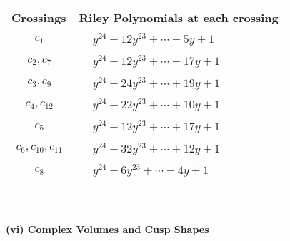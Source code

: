 \documentclass[1p]{elsarticle_modified}
\theoremstyle{definition}
\begin{document}
\begin{tabular}{m{50pt}|m{274pt}}
Crossings & \hspace{64pt}Riley Polynomials at each crossing \\
\hline $$\begin{aligned}c_{1}\end{aligned}$$&$\begin{aligned}
&y^{24}+12 y^{23}+\cdots-5 y+1
\end{aligned}$\\
\hline $$\begin{aligned}c_{2},c_{7}\end{aligned}$$&$\begin{aligned}
&y^{24}-12 y^{23}+\cdots-17 y+1
\end{aligned}$\\
\hline $$\begin{aligned}c_{3},c_{9}\end{aligned}$$&$\begin{aligned}
&y^{24}+24 y^{23}+\cdots+19 y+1
\end{aligned}$\\
\hline $$\begin{aligned}c_{4},c_{12}\end{aligned}$$&$\begin{aligned}
&y^{24}+22 y^{23}+\cdots+10 y+1
\end{aligned}$\\
\hline $$\begin{aligned}c_{5}\end{aligned}$$&$\begin{aligned}
&y^{24}+12 y^{23}+\cdots+17 y+1
\end{aligned}$\\
\hline $$\begin{aligned}c_{6},c_{10},c_{11}\end{aligned}$$&$\begin{aligned}
&y^{24}+32 y^{23}+\cdots+12 y+1
\end{aligned}$\\
\hline $$\begin{aligned}c_{8}\end{aligned}$$&$\begin{aligned}
&y^{24}-6 y^{23}+\cdots-4 y+1
\end{aligned}$\\
\hline
\end{tabular}\\~\\
\newpage\flushleft \textbf{(vi) Complex Volumes and Cusp Shapes}
\end{document}
